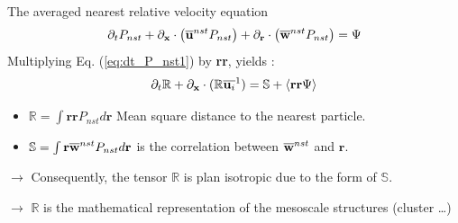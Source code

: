 \documentclass{sintefbeamer}
\begin{document}
\begin{frame}{The averaged nearest relative velocity equation}
  \begin{equation}
      \partial_t P_{nst}
      +  \partial_{\textbf{x}} \cdot
      \left(
        \overline{\textbf{u}}^{nst}
        P_{nst}
      \right)
    + 
       \partial_{\textbf{r}} \cdot
    \left(
        \overline{\textbf{w}}^{nst}
        P_{nst}
    \right)
    = \Psi
    \label{eq:dt_P_nst1}
\end{equation}
Multiplying Eq. (\ref{eq:dt_P_nst1}) by \textbf{rr}, yields :
\begin{equation*}
  \partial_t \mathbb{R} 
+ \partial_{\textbf{x}} \cdot (\mathbb{R} \overline{\textbf{u}_i}^{1}
)
= 
 \mathbb{S}
+ \left<\textbf{r}\textbf{r}\Psi\right>
\end{equation*}

\begin{itemize}
  \item $\mathbb{R} = \int \textbf{rr} P_{nst} d\textbf{r}$ Mean square distance to the nearest particle. 
  \item $\mathbb{S} = \int \textbf{r} \overline{\textbf{w}}^{nst}P_{nst} d\textbf{r}$ is the  correlation between $\overline{\textbf{w}}^{nst}$ and $\textbf{r}$. 
\end{itemize}

$\rightarrow$ Consequently, the tensor $\mathbb{R}$ is plan isotropic due to the form of $\mathbb{S}$.

$\rightarrow $ $\mathbb{R}$ is the mathematical representation of the mesoscale structures (cluster \ldots)
\vfill
\begin{figure}
  \centering
    \hfill
\end{figure}


\end{frame}
\end{document}
